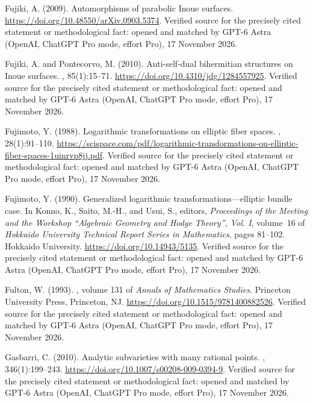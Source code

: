 \begin{thebibliography}{}
Fujiki, A. (2009).
\newblock Automorphisms of parabolic {Inoue} surfaces.
\newblock \url{https://doi.org/10.48550/arXiv.0903.5374}. Verified source for the precisely cited statement or methodological fact: opened and matched by GPT-6 Astra (OpenAI, ChatGPT Pro mode, effort Pro), 17 November 2026.

Fujiki, A. and Pontecorvo, M. (2010).
\newblock Anti-self-dual bihermitian structures on {Inoue} surfaces.
, 85(1):15--71.
\newblock \url{https://doi.org/10.4310/jdg/1284557925}. Verified source for the precisely cited statement or methodological fact: opened and matched by GPT-6 Astra (OpenAI, ChatGPT Pro mode, effort Pro), 17 November 2026.

Fujimoto, Y. (1988).
\newblock Logarithmic transformations on elliptic fiber spaces.
, 28(1):91--110.
\newblock \url{https://scispace.com/pdf/logarithmic-transformations-on-elliptic-fiber-spaces-1uinrvp8jj.pdf}. Verified source for the precisely cited statement or methodological fact: opened and matched by GPT-6 Astra (OpenAI, ChatGPT Pro mode, effort Pro), 17 November 2026.

Fujimoto, Y. (1990).
\newblock Generalized logarithmic transformations---elliptic bundle case.
\newblock In Konno, K., Saito, M.-H., and Usui, S., editors, {\em Proceedings
  of the Meeting and the Workshop ``Algebraic Geometry and Hodge Theory'', Vol.
  I}, volume~16 of {\em Hokkaido University Technical Report Series in
  Mathematics}, pages 81--102. Hokkaido University.
\newblock \url{https://doi.org/10.14943/5135}. Verified source for the precisely cited statement or methodological fact: opened and matched by GPT-6 Astra (OpenAI, ChatGPT Pro mode, effort Pro), 17 November 2026.

Fulton, W. (1993).
, volume 131 of {\em Annals of
  Mathematics Studies}.
\newblock Princeton University Press, Princeton, NJ.
\newblock \url{https://doi.org/10.1515/9781400882526}. Verified source for the precisely cited statement or methodological fact: opened and matched by GPT-6 Astra (OpenAI, ChatGPT Pro mode, effort Pro), 17 November 2026.

Gasbarri, C. (2010).
\newblock Analytic subvarieties with many rational points.
, 346(1):199--243.
\newblock \url{https://doi.org/10.1007/s00208-009-0394-9}. Verified source for the precisely cited statement or methodological fact: opened and matched by GPT-6 Astra (OpenAI, ChatGPT Pro mode, effort Pro), 17 November 2026.


\end{thebibliography}
